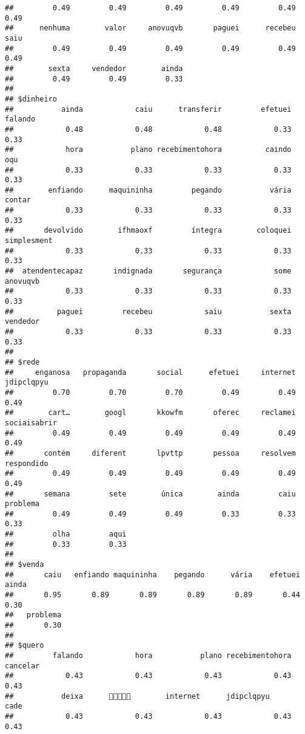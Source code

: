 \documentclass[
]{article}
\begin{document}
\begin{verbatim}
##         0.49         0.49         0.49         0.49         0.49         0.49 
##      nenhuma        valor     anovuqvb       paguei      recebeu         saiu 
##         0.49         0.49         0.49         0.49         0.49         0.49 
##        sexta     vendedor        ainda 
##         0.49         0.49         0.33 
## 
## $dinheiro
##           ainda            caiu      transferir         efetuei         falando 
##            0.48            0.48            0.48            0.33            0.33 
##            hora           plano recebimentohora          caindo             oqu 
##            0.33            0.33            0.33            0.33            0.33 
##        enfiando      maquininha         pegando           vária          contar 
##            0.33            0.33            0.33            0.33            0.33 
##       devolvido        ifhmaoxf         íntegra        coloquei     simplesment 
##            0.33            0.33            0.33            0.33            0.33 
##  atendentecapaz       indignada       segurança            some        anovuqvb 
##            0.33            0.33            0.33            0.33            0.33 
##          paguei         recebeu            saiu           sexta        vendedor 
##            0.33            0.33            0.33            0.33            0.33 
## 
## $rede
##     enganosa   propaganda       social      efetuei     internet   jdipclqpyu 
##         0.70         0.70         0.70         0.49         0.49         0.49 
##        cart…        googl       kkowfm       oferec     reclamei sociaisabrir 
##         0.49         0.49         0.49         0.49         0.49         0.49 
##       contém     diferent       lpvttp       pessoa     resolvem   respondido 
##         0.49         0.49         0.49         0.49         0.49         0.49 
##       semana         sete        única        ainda         caiu     problema 
##         0.49         0.49         0.49         0.33         0.33         0.33 
##         olha         aqui 
##         0.33         0.33 
## 
## $venda
##       caiu   enfiando maquininha    pegando      vária    efetuei      ainda 
##       0.95       0.89       0.89       0.89       0.89       0.44       0.30 
##   problema 
##       0.30 
## 
## $quero
##         falando            hora           plano recebimentohora        cancelar 
##            0.43            0.43            0.43            0.43            0.43 
##           deixa      🤬🤬🤬🤬🤬        internet      jdipclqpyu            cade 
##            0.43            0.43            0.43            0.43            0.43 

\end{verbatim}
\end{document}
